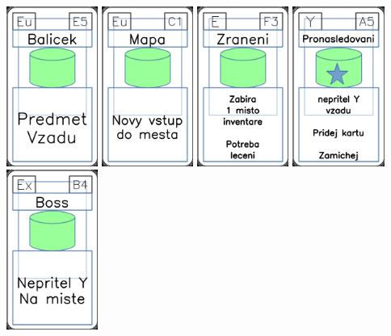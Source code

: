 \documentclass[a4paper]{article}
\begin{document}
	\includegraphics[width=3.0cm]{img-4_24}
	\includegraphics[width=3.0cm]{img-4_40}
	\includegraphics[width=3.0cm]{img-4_57}
	\includegraphics[width=3.0cm]{img-5_34}
	\includegraphics[width=3.0cm]{img-4_8}
\end{document}
